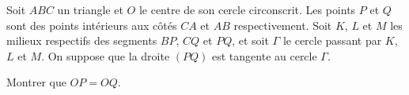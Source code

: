 Soit $ABC$ un triangle et $O$ le centre de son cercle circonscrit. Les points $P$ et $Q$ sont des points
intérieurs aux côtés $CA$ et $AB$ respectivement. Soit $K$, $L$ et $M$ les milieux respectifs des segments
$BP$, $CQ$ et $PQ$, et soit $\Gamma$ le cercle passant par $K$, $L$ et $M$. On suppose que la droite $(PQ)$
est tangente au cercle $\Gamma$.

Montrer que $OP = OQ$.
